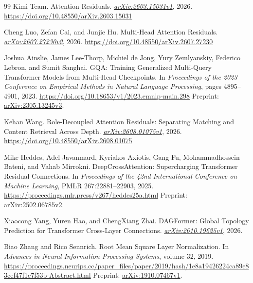 \documentclass[11pt,letterpaper]{article}
\begin{document}
\begin{thebibliography}{99}
Kimi Team.
\newblock Attention Residuals.
\newblock \href{https://arxiv.org/abs/2603.15031v1}{\emph{arXiv:2603.15031v1}}, 2026.
\newblock \url{https://doi.org/10.48550/arXiv.2603.15031}

Cheng Luo, Zefan Cai, and Junjie Hu.
\newblock Multi-Head Attention Residuals.
\newblock \href{https://arxiv.org/abs/2607.27230v2}{\emph{arXiv:2607.27230v2}}, 2026.
\newblock \url{https://doi.org/10.48550/arXiv.2607.27230}

Joshua Ainslie, James Lee-Thorp, Michiel de Jong, Yury Zemlyanskiy, Federico Lebron, and Sumit Sanghai.
\newblock GQA: Training Generalized Multi-Query Transformer Models from Multi-Head Checkpoints.
\newblock In \emph{Proceedings of the 2023 Conference on Empirical Methods in Natural Language Processing}, pages 4895--4901, 2023.
\newblock \url{https://doi.org/10.18653/v1/2023.emnlp-main.298}
\newblock Preprint: \href{https://arxiv.org/abs/2305.13245v3}{arXiv:2305.13245v3}.

Kehan Wang.
\newblock Role-Decoupled Attention Residuals: Separating Matching and Content Retrieval Across Depth.
\newblock \href{https://arxiv.org/abs/2608.01075v1}{\emph{arXiv:2608.01075v1}}, 2026.
\newblock \url{https://doi.org/10.48550/arXiv.2608.01075}

Mike Heddes, Adel Javanmard, Kyriakos Axiotis, Gang Fu, Mohammadhossein Bateni, and Vahab Mirrokni.
\newblock DeepCrossAttention: Supercharging Transformer Residual Connections.
\newblock In \emph{Proceedings of the 42nd International Conference on Machine Learning}, PMLR 267:22881--22903, 2025.
\newblock \url{https://proceedings.mlr.press/v267/heddes25a.html}
\newblock Preprint: \href{https://arxiv.org/abs/2502.06785v2}{arXiv:2502.06785v2}.

Xiaocong Yang, Yuren Hao, and ChengXiang Zhai.
\newblock DAGFormer: Global Topology Prediction for Transformer Cross-Layer Connections.
\newblock \href{https://arxiv.org/abs/2610.19625v1}{\emph{arXiv:2610.19625v1}}, 2026.

Biao Zhang and Rico Sennrich.
\newblock Root Mean Square Layer Normalization.
\newblock In \emph{Advances in Neural Information Processing Systems}, volume 32, 2019.
\newblock \url{https://proceedings.neurips.cc/paper_files/paper/2019/hash/1e8a19426224ca89e83cef47f1e7f53b-Abstract.html}
\newblock Preprint: \href{https://arxiv.org/abs/1910.07467v1}{arXiv:1910.07467v1}.


\end{thebibliography}
\end{document}
